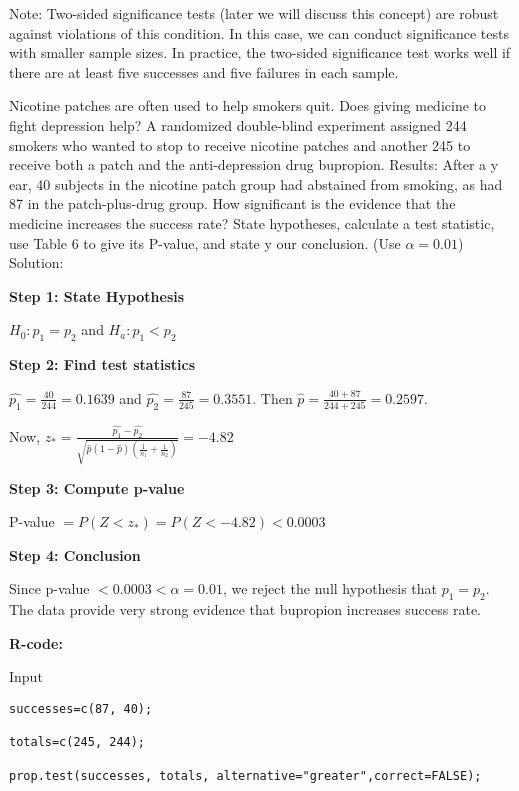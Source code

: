 Note: Two-sided significance tests (later we will discuss this concept) are robust against violations of this condition. In this case, we can conduct significance tests with smaller sample sizes. In practice, the two-sided significance test works well if there are at least five successes and five failures in each sample.

\begin{example}
Nicotine patches are often used to help smokers quit. Does giving medicine to fight depression help? A randomized double-blind experiment assigned 244 smokers who wanted to stop to receive nicotine patches and another 245 to receive both a patch and the anti-depression drug bupropion. Results: After a y ear, 40 subjects in the nicotine patch group had abstained from smoking, as had 87 in the patch-plus-drug group. How significant is the evidence that the medicine increases the success rate? State hypotheses, calculate a test statistic, use Table 6 to give its P-value, and state y our conclusion. (Use $\alpha = 0.01$)\\
Solution:

\textbf{Step 1: State Hypothesis}

$H_0: p_1 = p_2$ and $H_a: p_1 < p_2$

\textbf{Step 2: Find test statistics}

$\hat{p_1} = \frac{40}{244} = 0.1639$ and $\hat{p_2} = \frac{87}{245} = 0.3551$. Then $\hat{p} = \frac{40+87}{244+245} = 0.2597$.

Now, $z_* = \frac{\hat{p_1} - \hat{p_2}}{\sqrt{\hat{p}(1-\hat{p})(\frac{1}{n_1} + \frac{1}{n_2})}} = -4.82$

\textbf{Step 3: Compute p-value}

P-value $= P(Z < z_*) = P(Z < -4.82) < 0.0003$

\textbf{Step 4: Conclusion}

Since p-value $ < 0.0003 < \alpha = 0.01$, we reject the null hypothesis that $p_1 = p_2$. The data provide very strong evidence that bupropion increases success rate.

\textbf{R-code:}

Input
\begin{tcolorbox}[colback=gray!10, colframe=gray!50, arc=2mm]
\begin{verbatim}
successes=c(87, 40);

totals=c(245, 244);

prop.test(successes, totals, alternative="greater",correct=FALSE);
\end{verbatim}
\end{tcolorbox}


\end{example}
